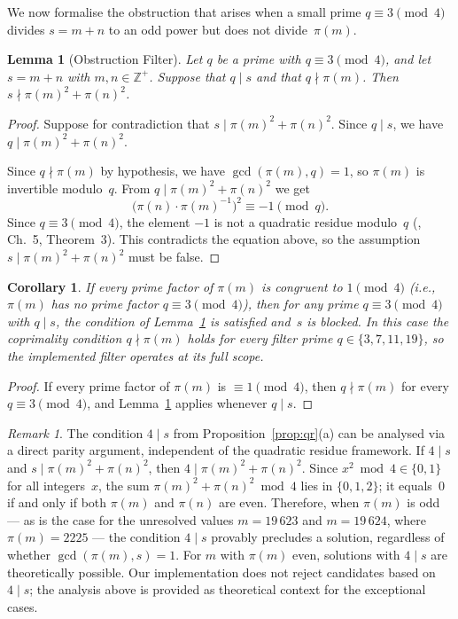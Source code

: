 \documentclass[11pt]{article}
\newtheorem{lemma}{Lemma}
\newtheorem{corollary}{Corollary}
\theoremstyle{definition}
\theoremstyle{remark}
\newtheorem{remark}{Remark}
\numberwithin{equation}{section}
\newcommand{\Zp}{\mathbb{Z}^{+}}
\begin{document}
We now formalise the obstruction that arises when a small prime
$q \equiv 3 \pmod{4}$ divides $s = m + n$ to an odd power but
does not divide~$\pi(m)$.

\begin{lemma}[Obstruction Filter]\label{lem:obstruction}
Let $q$ be a prime with $q \equiv 3 \pmod{4}$, and let
$s = m + n$ with $m, n \in \Zp$.
Suppose that $q \mid s$ and that $q \nmid \pi(m)$.
Then $s \nmid \pi(m)^2 + \pi(n)^2$.
\end{lemma}

\begin{proof}
Suppose for contradiction that $s \mid \pi(m)^2 + \pi(n)^2$.
Since $q \mid s$, we have $q \mid \pi(m)^2 + \pi(n)^2$.

Since $q \nmid \pi(m)$ by hypothesis, we have
$\gcd(\pi(m), q) = 1$, so $\pi(m)$ is invertible modulo~$q$.
From $q \mid \pi(m)^2 + \pi(n)^2$ we get
\[
\bigl(\pi(n) \cdot \pi(m)^{-1}\bigr)^2 \equiv -1 \pmod{q}.
\]
Since $q \equiv 3 \pmod{4}$, the element $-1$ is not a quadratic
residue modulo~$q$ (\cite{IrelandRosen}, Ch.~5, Theorem~3).
This contradicts the equation above, so the assumption
$s \mid \pi(m)^2 + \pi(n)^2$ must be false.
\end{proof}

\begin{corollary}\label{cor:maxobstruction}
If every prime factor of $\pi(m)$ is congruent to $1 \pmod{4}$
\textup{(}i.e., $\pi(m)$ has no prime factor $q \equiv 3 \pmod{4}$\textup{)},
then for any prime $q \equiv 3 \pmod{4}$ with $q \mid s$,
the condition of
Lemma~\textup{\ref{lem:obstruction}} is satisfied and~$s$ is
blocked.
In this case the coprimality condition $q \nmid \pi(m)$ holds
for every filter prime $q \in \{3, 7, 11, 19\}$, so the
implemented filter operates at its full scope.
\end{corollary}

\begin{proof}
If every prime factor of $\pi(m)$ is $\equiv 1 \pmod{4}$, then
$q \nmid \pi(m)$ for every $q \equiv 3 \pmod{4}$, and
Lemma~\ref{lem:obstruction} applies whenever $q \mid s$.
\end{proof}

\begin{remark}\label{rem:parity}
The condition $4 \mid s$ from Proposition~\textup{\ref{prop:qr}(a)}
can be analysed via a direct parity argument,
independent of the quadratic residue framework.
If $4 \mid s$ and $s \mid \pi(m)^2 + \pi(n)^2$, then
$4 \mid \pi(m)^2 + \pi(n)^2$.
Since $x^2 \bmod 4 \in \{0, 1\}$ for all integers~$x$, the sum
$\pi(m)^2 + \pi(n)^2 \bmod 4$ lies in $\{0, 1, 2\}$; it equals~$0$
if and only if both $\pi(m)$ and $\pi(n)$ are even.
Therefore, when $\pi(m)$ is odd --- as is the case for the
unresolved values $m = 19\,623$ and $m = 19\,624$, where
$\pi(m) = 2225$ --- the condition $4 \mid s$ provably precludes a
solution, regardless of whether $\gcd(\pi(m), s) = 1$.
For $m$ with $\pi(m)$ even, solutions with $4 \mid s$ are
theoretically possible.
Our implementation does not reject candidates based on
$4 \mid s$; the analysis above is provided as theoretical context
for the exceptional cases.
\end{remark}
\end{document}
